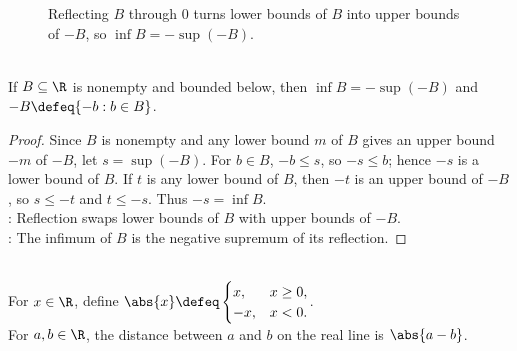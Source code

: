 \begin{figure}[H]
  \centering
  
  \caption{Reflecting $B$ through $0$ turns lower bounds of $B$ into upper bounds of $-B$, so $\inf B=-\sup(-B)$.}
  \label{fig:infimum-reflection-via-supremum}
\end{figure}

\begin{corollary} \label{cor:infimum-as-negative-supremum} \\
If $B\subseteq\R$ is nonempty and bounded below, then $\inf B=-\sup(-B)$ and $-B\defeq\{-b:b\in B\}$.
\begin{proof}
Since $B$ is nonempty and any lower bound $m$ of $B$ gives an upper bound $-m$ of $-B$, let $s=\sup(-B)$. For $b\in B$, $-b\leq s$, so $-s\leq b$; hence $-s$ is a lower bound of $B$. If $t$ is any lower bound of $B$, then $-t$ is an upper bound of $-B$, so $s\leq -t$ and $t\leq -s$. Thus $-s=\inf B$.\\
: Reflection swaps lower bounds of $B$ with upper bounds of $-B$.\\
: The infimum of $B$ is the negative supremum of its reflection.
\end{proof}
\end{corollary}


\begin{definition} \label{def:real-absolute-value-and-distance} \\
For $x\in\R$, define $\abs{x}\defeq
\begin{cases}
x, & x\geq0,\\
-x, & x<0.
\end{cases}$.\\
For $a,b\in\R$, the distance between $a$ and $b$ on the real line is $\abs{a-b}$.
\end{definition}

